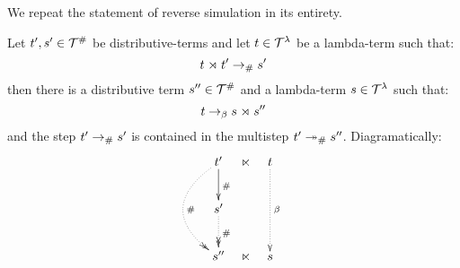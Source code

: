 
We repeat the statement of reverse simulation in its entirety.

Let $t',s' \in \mathcal{T}^{\mathtt{\#}}$ be distributive-terms and let $t \in \mathcal{T}^{\lambda}$ be a lambda-term such that:
\[
  t \mathrel{\rtimes} t' \mathrel{\to_{\mathtt{\#}}} s'
\]
then there is a distributive term $s'' \in \mathcal{T}^{\mathtt{\#}}$ and a lambda-term $s \in \mathcal{T}^{\lambda}$ such that:
\[
  t \mathrel{\to_\beta} s \mathrel{\rtimes} s''
\]
and the step $t' \mathrel{\to_{\mathtt{\#}}} s'$ is contained in the multistep $t' \mathrel{\mathrel{\twoheadrightarrow}_{\mathtt{\#}}} s''$.
Diagramatically:
\[
\xymatrix@C=.25cm{
\tm' \ar[d]^{\dist} \ar@{.>>}@/_1cm/[dd]^{\dist} & \refines  & \tm    \ar@{.>}[dd]^{\beta} \\
\tmtwo' \ar@{.>>}[d]^{\dist}                     &            &                             \\
\tmtwo''                                         & \refines  & \tmtwo                      \\
}
\]


